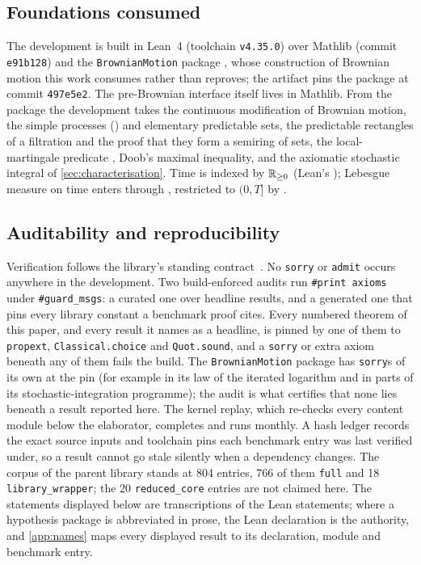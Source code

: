 \documentclass[11pt]{article}
\begin{document}
\subsection{Foundations consumed}
The development is built in Lean~4 \cite{deMouraUllrich2021} (toolchain \texttt{v4.35.0}) over Mathlib
\cite{Mathlib2020} (commit \texttt{e91b128}) and the \texttt{BrownianMotion} package
\cite{BrownianMotionRepo,DegenneEtAl2025}, whose construction of Brownian motion this work consumes rather than
reproves; the artifact pins the package at commit \texttt{497e5e2}. The pre-Brownian interface itself lives in
Mathlib. From the package the development takes the continuous modification of Brownian motion, the simple
processes () and elementary predictable sets, the predictable rectangles of a filtration and the
proof that they form a semiring of sets, the local-martingale predicate , Doob's maximal
inequality, and the axiomatic stochastic integral of \cref{sec:characterisation}. Time is indexed by $\mathbb{R}_{\ge0}$
(Lean's ); Lebesgue measure on time enters through , restricted to $(0,T]$ by
.

\subsection{Auditability and reproducibility}
Verification follows the library's standing contract~\cite{CoelhoLibrary}. No \texttt{sorry} or
\texttt{admit} occurs anywhere in the development. Two build-enforced audits run \texttt{\#print axioms}
under \texttt{\#guard\_msgs}: a curated one over headline results, and a generated one that pins every
library constant a benchmark proof cites. Every numbered theorem of this paper, and every result it names
as a headline, is pinned by one of them to \texttt{propext}, \texttt{Classical.choice} and
\texttt{Quot.sound}, and a \texttt{sorry} or extra axiom beneath any of them fails the build. The \texttt{BrownianMotion}
package has \texttt{sorry}s of its own at the pin (for example in its law of the iterated logarithm and in parts of its
stochastic-integration programme); the audit is what certifies that none lies beneath a result reported here. The kernel replay, which
re-checks every content module below the elaborator, completes and runs monthly. A hash ledger records the exact
source inputs and toolchain pins each benchmark entry was last verified under, so a result cannot go
stale silently when a dependency changes. The corpus of the parent library stands at 804 entries, 766 of them
\texttt{full} and 18 \texttt{library\_wrapper}; the 20 \texttt{reduced\_core} entries are not claimed here. The
statements displayed below are transcriptions of the Lean statements; where a hypothesis package is abbreviated in
prose, the Lean declaration is the authority, and \cref{app:names} maps every displayed result to its declaration,
module and benchmark entry.
\end{document}
